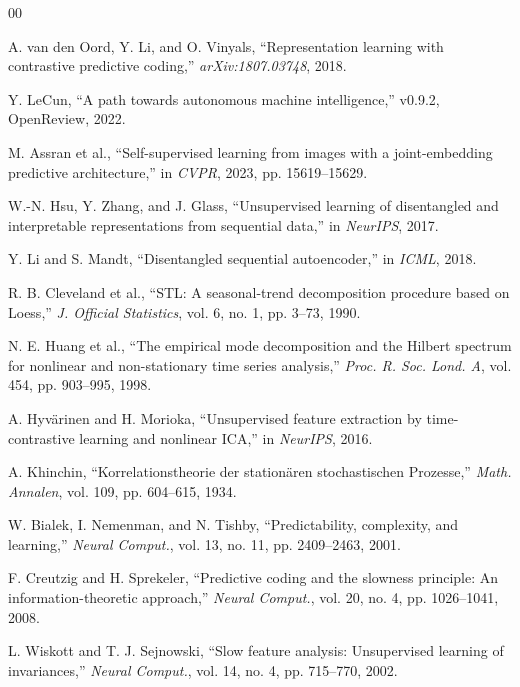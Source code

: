 \documentclass[conference]{IEEEtran}
\begin{document}






\scriptsize
\begin{thebibliography}{00}
\setlength{\itemsep}{0pt}

 A. van den Oord, Y. Li, and O. Vinyals, ``Representation learning with contrastive predictive coding,'' \emph{arXiv:1807.03748}, 2018.

 Y. LeCun, ``A path towards autonomous machine intelligence,'' v0.9.2, OpenReview, 2022.

 M. Assran et al., ``Self-supervised learning from images with a joint-embedding predictive architecture,'' in \emph{CVPR}, 2023, pp. 15619--15629.

 W.-N. Hsu, Y. Zhang, and J. Glass, ``Unsupervised learning of disentangled and interpretable representations from sequential data,'' in \emph{NeurIPS}, 2017.

 Y. Li and S. Mandt, ``Disentangled sequential autoencoder,'' in \emph{ICML}, 2018.

 R. B. Cleveland et al., ``STL: A seasonal-trend decomposition procedure based on Loess,'' \emph{J. Official Statistics}, vol. 6, no. 1, pp. 3--73, 1990.

 N. E. Huang et al., ``The empirical mode decomposition and the Hilbert spectrum for nonlinear and non-stationary time series analysis,'' \emph{Proc. R. Soc. Lond. A}, vol. 454, pp. 903--995, 1998.

 A. Hyv\"{a}rinen and H. Morioka, ``Unsupervised feature extraction by time-contrastive learning and nonlinear ICA,'' in \emph{NeurIPS}, 2016.

 A. Khinchin, ``Korrelationstheorie der station\"{a}ren stochastischen Prozesse,'' \emph{Math. Annalen}, vol. 109, pp. 604--615, 1934.

 W. Bialek, I. Nemenman, and N. Tishby, ``Predictability, complexity, and learning,'' \emph{Neural Comput.}, vol. 13, no. 11, pp. 2409--2463, 2001.

 F. Creutzig and H. Sprekeler, ``Predictive coding and the slowness principle: An information-theoretic approach,'' \emph{Neural Comput.}, vol. 20, no. 4, pp. 1026--1041, 2008.

 L. Wiskott and T. J. Sejnowski, ``Slow feature analysis: Unsupervised learning of invariances,'' \emph{Neural Comput.}, vol. 14, no. 4, pp. 715--770, 2002.


\end{thebibliography}
\end{document}
